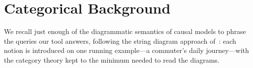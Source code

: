 \documentclass[runningheads]{llncs}
\begin{document}

\section{Categorical Background}\label{sec:background}

We recall just enough of the diagrammatic semantics of causal models to phrase the queries our tool answers, following the string diagram approach of~\cite{jacobs2021causal,jacobs2019causal}: each notion is introduced on one running example---a commuter's daily journey---with the category theory kept to the minimum needed to read the diagrams.
\end{document}
